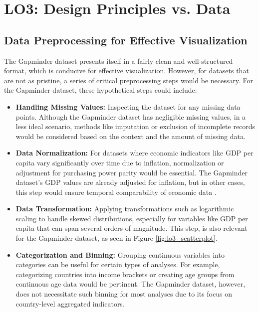 \section{LO3: Design Principles vs. Data}

\subsection{Data Preprocessing for Effective Visualization}
The Gapminder dataset presents itself in a fairly clean and well-structured format, which is conducive for effective visualization. However, for datasets that are not as pristine, a series of critical preprocessing steps would be necessary. For the Gapminder dataset, these hypothetical steps could include:

\begin{itemize}
  \item \textbf{Handling Missing Values:} Inspecting the dataset for any missing data points. Although the Gapminder dataset has negligible missing values, in a less ideal scenario, methods like imputation or exclusion of incomplete records would be considered based on the context and the amount of missing data.
  
  \item \textbf{Data Normalization:} For datasets where economic indicators like GDP per capita vary significantly over time due to inflation, normalization or adjustment for purchasing power parity would be essential. The Gapminder dataset's GDP values are already adjusted for inflation, but in other cases, this step would ensure temporal comparability of economic data \cite{GDPCapitaV25}.
  
  \item \textbf{Data Transformation:} Applying transformations such as logarithmic scaling to handle skewed distributions, especially for variables like GDP per capita that can span several orders of magnitude. This step, is also relevant for the Gapminder dataset, as seen in Figure \ref{fig:lo3_scatterplot}.
  
  \item \textbf{Categorization and Binning:} Grouping continuous variables into categories can be useful for certain types of analyses. For example, categorizing countries into income brackets or creating age groups from continuous age data would be pertinent. The Gapminder dataset, however, does not necessitate such binning for most analyses due to its focus on country-level aggregated indicators.
\end{itemize}

